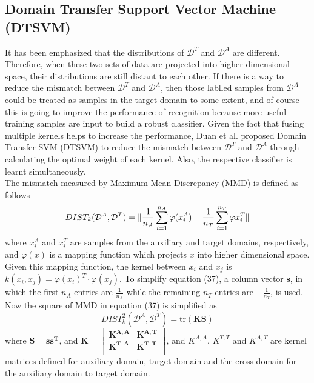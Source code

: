 \subsection{Domain Transfer Support Vector Machine (DTSVM)}
It has been emphasized that the distributions of $\mathcal{D}^T$ and $\mathcal{D}^A$ are different. Therefore, when these two sets of data are projected into higher dimensional space, their distributions are still distant to each other. If there is a way to reduce the mismatch between $\mathcal{D}^T$ and $\mathcal{D}^A$, then those lablled samples from $\mathcal{D}^A$ could be treated as samples in the target domain to some extent, and of course this is going to improve the performance of recognition because more useful training samples are input to build a robust classifier. Given the fact that fusing multiple kernels helps to increase the performance, Duan et al. \cite{duan2009domain} proposed Domain Transfer SVM (DTSVM) to reduce the mismatch between $\mathcal{D}^T$ and $\mathcal{D}^A$ through calculating the optimal weight of each kernel. Also, the respective classifier is learnt simultaneously. \\

\noindent The mismatch measured by Maximum Mean Discrepancy (MMD) \cite{borgwardt2006integrating} is defined as follows
\begin{equation}
DIST_k(\mathcal{D}^A, \mathcal{D}^T) = \lVert \frac{1}{n_A} \sum_{i=1}^{n_A} \varphi(x_i^A) - \frac{1}{n_T} \sum_{i=1}^{n_T} \varphi{x_i^T} \rVert
\end{equation}
where $x_i^A$ and $x_i^T$ are samples from the auxiliary and target domains, respectively, and $\varphi(x)$ is a mapping function which projects $x$ into higher dimensional space. Given this mapping function, the kernel between $x_i$
 and $x_j$ is $k(x_i, x_j) = \varphi (x_i)^T \cdot \varphi (x_j)$. To simplify equation (37), a column vector $\mathbf{s}$, in which the first $n_A$ entries are $\frac{1}{n_A}$ while the remaining $n_T$ entries are $-\frac{1}{n_T}$, is used. Now the square of MMD in equation (37) is simplified as 
\begin{equation}
DIST_k^2(\mathcal{D}^A, \mathcal{D}^T) = \text{tr}(\mathbf{KS})
\end{equation}
where $\mathbf{S = s s^T }$, and $\mathbf{K = \begin{bmatrix} K^{A,A} & K^{A,T} \\ K^{T, A} & K^{T,T}\\  \end{bmatrix}}$, and $K^{A,A}$, $K^{T,T}$ and $K^{A, T}$ are kernel matrices defined for auxiliary domain, target domain and the cross domain for the auxiliary domain to target domain.\\ 

